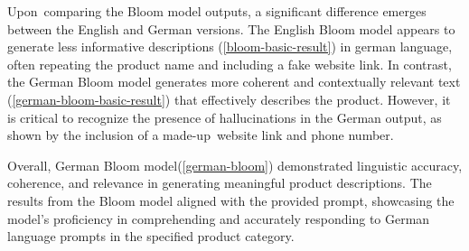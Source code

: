 Upon comparing the Bloom model outputs, a significant difference emerges between the English and German versions. The English Bloom model appears to generate less informative descriptions (\autoref{bloom-basic-result}) in german language, often repeating the product name and including a fake website link. In contrast, the German Bloom model generates more coherent and contextually relevant text (\autoref{german-bloom-basic-result}) that effectively describes the product. However, it is critical to recognize the presence of hallucinations in the German output, as shown by the inclusion of a made-up website link and phone number. 

\begin{center}
	\par
\end{center}


\begin{center}
	\par
	
\end{center}

Overall, German Bloom model(\autoref{german-bloom}) demonstrated linguistic accuracy, coherence, and relevance in generating meaningful product descriptions. The results from the Bloom model aligned with the provided prompt, showcasing the model's proficiency in comprehending and accurately responding to German language prompts in the specified product category.




